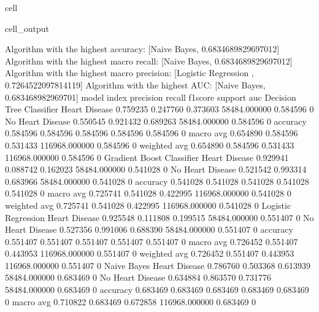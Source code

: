 \documentclass[letterpaper,10pt,english]{jupyterBook}
\begin{document}
\begin{sphinxuseclass}{cell}
\begin{sphinxVerbatimOutput}
\begin{sphinxuseclass}{cell_output}
\begin{sphinxVerbatim}[commandchars=\\\{\}]
Algorithm with the highest accuracy: [\PYGZsq{}Naive Bayes\PYGZsq{}, 0.6834689829697012]
Algorithm with the highest macro recall:
        [\PYGZsq{}Naive Bayes\PYGZsq{}, 0.6834689829697012]
Algorithm with the highest macro precision:
        [\PYGZsq{}Logistic Regression \PYGZsq{}, 0.7264522097814119]
Algorithm with the highest AUC:
        [\PYGZsq{}Naive Bayes\PYGZsq{}, 0.683468982969701]
model                      index             precision  recall    f1\PYGZhy{}score  support        auc     
Decision Tree Classifier   Heart Disease     0.759235   0.247760  0.373603  58484.000000   0.584596    0
                           No Heart Disease  0.550545   0.921432  0.689263  58484.000000   0.584596    0
                           accuracy          0.584596   0.584596  0.584596  0.584596       0.584596    0
                           macro avg         0.654890   0.584596  0.531433  116968.000000  0.584596    0
                           weighted avg      0.654890   0.584596  0.531433  116968.000000  0.584596    0
Gradient Boost Classifier  Heart Disease     0.929941   0.088742  0.162023  58484.000000   0.541028    0
                           No Heart Disease  0.521542   0.993314  0.683966  58484.000000   0.541028    0
                           accuracy          0.541028   0.541028  0.541028  0.541028       0.541028    0
                           macro avg         0.725741   0.541028  0.422995  116968.000000  0.541028    0
                           weighted avg      0.725741   0.541028  0.422995  116968.000000  0.541028    0
Logistic Regression        Heart Disease     0.925548   0.111808  0.199515  58484.000000   0.551407    0
                           No Heart Disease  0.527356   0.991006  0.688390  58484.000000   0.551407    0
                           accuracy          0.551407   0.551407  0.551407  0.551407       0.551407    0
                           macro avg         0.726452   0.551407  0.443953  116968.000000  0.551407    0
                           weighted avg      0.726452   0.551407  0.443953  116968.000000  0.551407    0
Naive Bayes                Heart Disease     0.786760   0.503368  0.613939  58484.000000   0.683469    0
                           No Heart Disease  0.634884   0.863570  0.731776  58484.000000   0.683469    0
                           accuracy          0.683469   0.683469  0.683469  0.683469       0.683469    0
                           macro avg         0.710822   0.683469  0.672858  116968.000000  0.683469    0

\end{sphinxVerbatim}
\end{sphinxuseclass}
\end{sphinxVerbatimOutput}
\end{sphinxuseclass}
\end{document}
